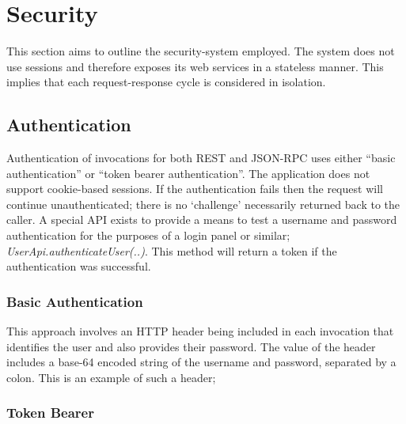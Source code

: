 
\section{Security}
\label{security}

This section aims to outline the security-system employed.  The system does not use sessions and therefore exposes its web services in a stateless manner.  This implies that each request-response cycle is considered in isolation.

\subsection{Authentication}


Authentication of invocations for both REST and JSON-RPC uses either ``basic authentication'' or ``token bearer authentication''.  The application does not support cookie-based sessions.  If the authentication fails then the request will continue unauthenticated; there is no `challenge' necessarily returned back to the caller.  A special API exists to provide a means to test a username and password authentication for the purposes of a login panel or similar; {\it UserApi.authenticateUser(..)}.  This method will return a token if the authentication was successful.

\subsubsection{Basic Authentication}

This approach involves an HTTP header being included in each invocation that identifies the user and also provides their password.  The value of the header includes a base-64 encoded string of the username and password, separated by a colon.  This is an example of such a header;


\subsubsection{Token Bearer}
\label{token-bearer-authentication}

